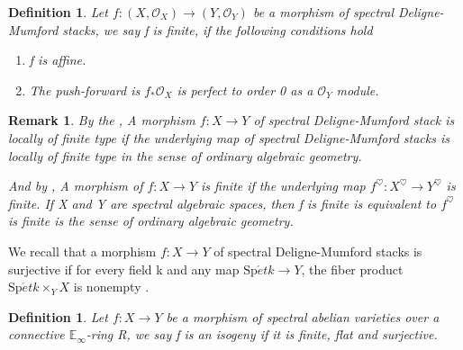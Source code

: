 \documentclass[12pt]{article}
\theoremstyle{thry}
\newtheorem{definition}[theorem]{Definition}
\newtheorem{remark}[theorem]{Remark}
\def  \Spet     {\mathrm{Sp}\acute{e}t}
\def  \co       {\mathcal{O}}
\def  \be       {\mathbb{E}}
\begin{document}
\begin{definition}\cite[Definition 5.2.0.1]{lu-SAG}
	Let $f: (X, \co_X )\to (Y, \co_Y)$ be a morphism of spectral Deligne-Mumford stacks, we say f is finite, if the following conditions hold
	\begin{enumerate}
		\item  f is  affine.
		\item  The push-forward is $f_* \co_X$ is perfect to order 0 as a $\co_Y$ module. 
	\end{enumerate}
\end{definition}


\begin{remark} \label{finite}
By the \cite[Example 4.2.0.2]{lu-SAG},  A morphism $f: X \to Y$ of spectral Deligne-Mumford stack is locally of finite type if the underlying map of spectral Deligne-Mumford stacks is locally of finite type in the sense of ordinary algebraic geometry. 

And by \cite[ 5.2.0.2]{lu-SAG}, A morphism of  $f: X \to Y$  is finite if
 the underlying map  $f^{\heartsuit} : X^{\heartsuit} \to Y^{\heartsuit}$ is finite.  If  X and Y are spectral algebraic spaces, then f is finite is equivalent to $f^{\heartsuit}$ is finite is the sense of ordinary algebraic geometry.


\end{remark}
We recall that a morphism $f: X \to Y$ of spectral Deligne-Mumford stacks is surjective if for every field k and  any map $\Spet k \to Y$, the fiber product $\Spet k \times_Y X$ is nonempty \cite[Definition 3.5.5.5]{lu-SAG}.


\begin{definition}
	Let $f: X \to Y$ be a morphism of spectral abelian varieties over a connective $\be_{\infty}$-ring R, we say f is an isogeny if it is finite, flat and surjective.
\end{definition}
\end{document}
